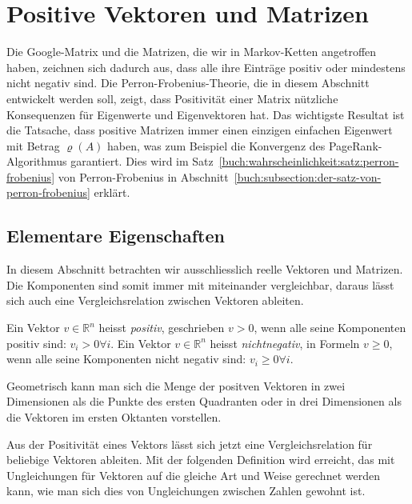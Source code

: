 %
%
%
\section{Positive Vektoren und Matrizen
\label{buch:section:positive-vektoren-und-matrizen}}
Die Google-Matrix und die Matrizen, die wir in Markov-Ketten angetroffen
%
haben, zeichnen sich dadurch aus, dass alle ihre Einträge positiv oder
mindestens nicht negativ sind.
Die Perron-Frobenius-Theorie, die in diesem Abschnitt entwickelt
%
werden soll, zeigt, dass Positivität einer Matrix nützliche
Konsequenzen für Eigenwerte und Eigenvektoren hat.
Das wichtigste Resultat ist die Tatsache, dass positive Matrizen immer
einen einzigen einfachen Eigenwert mit Betrag $\varrho(A)$ haben,
was zum Beispiel die Konvergenz des PageRank-Algorithmus garantiert.
Dies wird im Satz~\ref{buch:wahrscheinlichkeit:satz:perron-frobenius}
von Perron-Frobenius in
Abschnitt~\ref{buch:subsection:der-satz-von-perron-frobenius}
erklärt.

%
%
\subsection{Elementare Eigenschaften
\label{buch:subsection:elementare-eigenschaften}}
In diesem Abschnitt betrachten wir ausschliesslich reelle Vektoren
und Matrizen.
Die Komponenten sind somit immer mit miteinander vergleichbar, daraus
lässt sich auch eine Vergleichsrelation zwischen Vektoren
ableiten.

\begin{definition}
Ein Vektor $v\in\mathbb{R}^n$ heisst {\em positiv}, geschrieben
$v>0$, wenn alle seine Komponenten positiv sind: $v_i>0\forall i$.
Ein Vektor $v\in\mathbb{R}^n$ heisst {\em nichtnegativ}, in Formeln
$v\ge 0$, wenn alle
seine Komponenten nicht negativ sind: $v_i\ge 0\forall i$.
%
%
\end{definition}

Geometrisch kann man sich die Menge der positven Vektoren in zwei Dimensionen
als die Punkte des ersten Quadranten oder in drei Dimensionen als die
%
%
Vektoren im ersten Oktanten vorstellen.

Aus der Positivität eines Vektors lässt sich jetzt eine Vergleichsrelation
für beliebige Vektoren ableiten.
Mit der folgenden Definition wird erreicht, das mit Ungleichungen für Vektoren
auf die gleiche Art und Weise gerechnet werden kann, wie man sich
dies von Ungleichungen zwischen Zahlen gewohnt ist.


